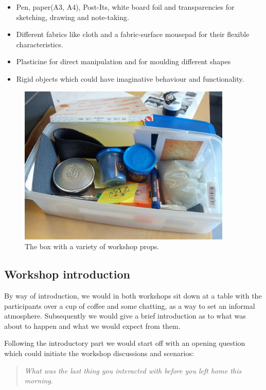 \begin{itemize}
  \item{Pen, paper(A3, A4), Post-Its, white board foil and transparencies for sketching, drawing and note-taking.}
  \item{Different fabrics like cloth and a fabric-surface mousepad for their flexible characteristics.}
  \item{Plasticine for direct manipulation and for moulding different shapes}
  \item{Rigid objects which could have imaginative behaviour and functionality.}
\end{itemize}

\begin{figure}[hb]
  \centering
    \includegraphics[width=4in]{workshops/props-box}
    \caption[A box with a variety of workshop props.] %
  {The box with a variety of workshop props.} %
  \label{ch:workshops:props-box}
\end{figure}

\subsection{Workshop introduction}

By way of introduction, we would in both workshops sit down at a table with the participants over a cup of coffee and some chatting, as a way to set an informal atmosphere.
Subsequently we would give a brief introduction as to what was about to happen and what we would expect from them.

Following the introductory part we would start off with an opening question which could initiate the workshop discussions and scenarios:

\begin{quotation}
  \em What was the last thing you interacted with before you left home this morning.
\end{quotation}

